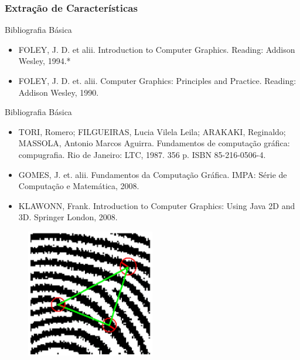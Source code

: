 \documentclass{beamer}
\begin{document}

\begin{frame}
\frametitle{Extração de Características}
		\begin{block}{Bibliografia Básica}
			
			\begin{itemize}
				\item FOLEY, J. D. et alii. Introduction to Computer Graphics. Reading: Addison Wesley, 1994.*
				\item FOLEY, J. D. et. alii. Computer Graphics: Principles and Practice. Reading: Addison Wesley, 1990. 
			\end{itemize}

		\end{block}
		
		\begin{block}{Bibliografia Básica}
			
			\begin{itemize}
				\item TORI, Romero; FILGUEIRAS, Lucia Vilela Leila; ARAKAKI, Reginaldo; MASSOLA, Antonio Marcos Aguirra. Fundamentos de computação gráfica: compugrafia. Rio de Janeiro: LTC, 1987. 356 p. ISBN 85-216-0506-4.
				
				\item GOMES, J. et. alii. Fundamentos da Computação Gráfica. IMPA: Série de Computação e Matemática, 2008.
				
				\item KLAWONN, Frank. Introduction to Computer Graphics: Using Java 2D and 3D. Springer London, 2008. 
			\end{itemize}

		\end{block}

	\begin{figure}[!h]
		\begin{center}
			\includegraphics[width=0.5\textwidth]{Figures/semelhancas}
		\end{center}
		
	\end{figure}
	
\end{frame}
\end{document}
